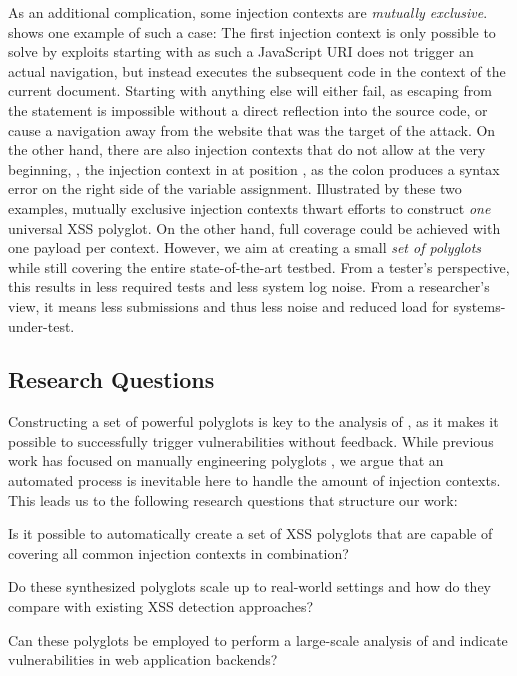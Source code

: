 As an additional complication, some injection contexts are \emph{mutually exclusive}.
 shows one example of such a case: The first injection context is only possible to solve by exploits starting with  as such a JavaScript URI does not trigger an actual navigation, but instead executes the subsequent code in the context of the current document.
Starting with anything else will either fail, as escaping from the statement is impossible without a direct reflection into the source code, or cause a navigation away from the website that was the target of the attack.
On the other hand, there are also injection contexts that do not allow  at the very beginning, \eg, the injection context in  at position , as the colon produces a syntax error on the right side of the variable assignment.
Illustrated by these two examples, mutually exclusive injection contexts thwart efforts to construct \emph{one} universal XSS polyglot.
On the other hand, full coverage could be achieved with one payload per context.
However, we aim at creating a small \emph{set of polyglots} while still covering the entire state-of-the-art testbed.
From a tester's perspective, this results in less required tests and less system log noise.
From a researcher's view, it means less submissions and thus less noise and reduced load for systems-under-test.



\subsection{Research Questions}\label{sec:rqs}

Constructing a set of powerful polyglots is key to the analysis of \blindxss{}, as it makes it possible to successfully trigger vulnerabilities without feedback. While previous work has focused on manually engineering polyglots \cite{ultimate-polyglot, szurek-polyglot, ostorlab-polyglot}, we argue that an automated process is inevitable here to handle the amount of injection contexts. This leads us to the following research questions that structure our work:
\begin{questions}
\setlength\itemsep{-0.3em} %
	\item Is it possible to automatically create a set of XSS polyglots that are capable of covering all common injection contexts in combination?\label{rq:1}
	\item Do these synthesized polyglots scale up to real-world settings and how do they compare with existing XSS detection approaches?\label{rq:2}
	\item Can these polyglots be employed to perform a large-scale analysis of \blindxss{} and indicate vulnerabilities in web application backends?\label{rq:3}
\end{questions}

